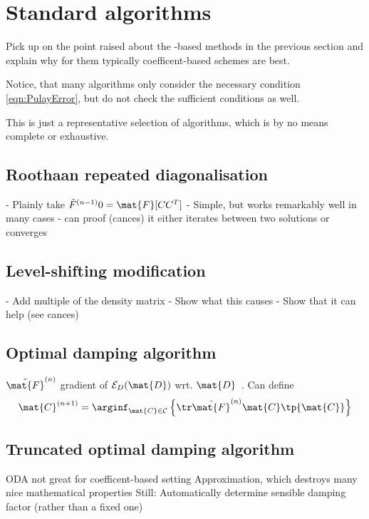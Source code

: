 \section{Standard \SCF algorithms}
\label{sec:SCFAlgorithms}

Pick up on the point raised about the \contraction-based
methods in the previous section
and explain why for them typically
coefficent-based \SCF schemes are best.





Notice, that many \SCF algorithms only consider the necessary condition \eqref{eqn:PulayError},
but do not check the sufficient conditions as well.


This is just a representative selection of algorithms,
which is by no means complete or exhaustive.

\subsection{Roothaan repeated diagonalisation}
\label{sec:RoothaanRepeatedDiag}
- Plainly take $\tilde{F}^{(n-1)}0= \mat{F}[CC^T]$
- Simple, but works remarkably well in many cases
- can proof (cances) it either iterates between two solutions or converges

\subsection{Level-shifting modification}
- Add multiple of the density matrix
- Show what this causes
- Show that it can help (see cances)

\subsection{Optimal damping algorithm}
\label{sec:ODA}
$\tilde{\mat{F}}^{(n)}$ gradient of $\mathcal{E}_D(\mat{D})$
wrt. $\mat{D}$~\cite{Lions1988,Cances2000}.
Can define~\cite{Lions1988,Cances2000}
\[
	\mat{C}^{(n+1)} = \arginf_{\mat{C} \in \mathcal{C}}
\left\{ \tr \tilde{\mat{F}}^{(n)} \mat{C} \tp{\mat{C}} \right\} \]

\subsection{Truncated optimal damping algorithm}
ODA not great for coefficent-based setting
Approximation, which destroys many nice mathematical properties
Still: Automatically determine sensible damping factor (rather than a fixed one)

